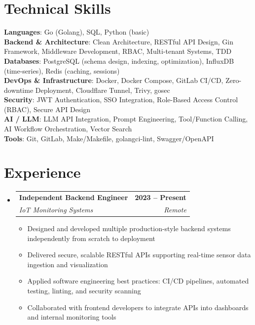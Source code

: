 \documentclass[letterpaper,11pt]{article}
\makeatletter
\newcommand{\resumeItem}[1]{
  \item\small{
    {#1 \vspace{-2pt}}
  }
}
\newcommand{\resumeSubheading}[4]{
  \vspace{-2pt}\item
    \begin{tabular*}{1.0\textwidth}[t]{l@{\extracolsep{\fill}}r}
      \textbf{#1} & \textbf{\small #2} \\
      \textit{\small#3} & \textit{\small #4} \\
    \end{tabular*}\vspace{-7pt}
}
\newcommand{\resumeSubHeadingListStart}{\begin{itemize}[leftmargin=0.0in, label={}]}
\newcommand{\resumeSubHeadingListEnd}{\end{itemize}}
\newcommand{\resumeItemListStart}{\begin{itemize}}
\newcommand{\resumeItemListEnd}{\end{itemize}\vspace{-5pt}}
\makeatother
\begin{document}
\section{Technical Skills}
 \begin{itemize}[leftmargin=0.15in, label={}]
    \small{\item{
     \textbf{Languages}{: Go (Golang), SQL, Python (basic)} \\
     \textbf{Backend \& Architecture}{: Clean Architecture, RESTful API Design, Gin Framework, Middleware Development, RBAC, Multi-tenant Systems, TDD} \\
     \textbf{Databases}{: PostgreSQL (schema design, indexing, optimization), InfluxDB (time-series), Redis (caching, sessions)} \\
     \textbf{DevOps \& Infrastructure}{: Docker, Docker Compose, GitLab CI/CD, Zero-downtime Deployment, Cloudflare Tunnel, Trivy, gosec} \\
     \textbf{Security}{: JWT Authentication, SSO Integration, Role-Based Access Control (RBAC), Secure API Design} \\
     \textbf{AI / LLM}{: LLM API Integration, Prompt Engineering, Tool/Function Calling, AI Workflow Orchestration, Vector Search} \\
     \textbf{Tools}{: Git, GitLab, Make/Makefile, golangci-lint, Swagger/OpenAPI}
    }}
 \end{itemize}
 \vspace{-16pt}


\section{Experience}
  \resumeSubHeadingListStart

    \resumeSubheading
      {Independent Backend Engineer}{2023 -- Present}
      {IoT Monitoring Systems}{Remote}
      \resumeItemListStart
        \resumeItem{Designed and developed multiple production-style backend systems independently from scratch to deployment}
        \resumeItem{Delivered secure, scalable RESTful APIs supporting real-time sensor data ingestion and visualization}
        \resumeItem{Applied software engineering best practices: CI/CD pipelines, automated testing, linting, and security scanning}
        \resumeItem{Collaborated with frontend developers to integrate APIs into dashboards and internal monitoring tools}
      \resumeItemListEnd
    
  \resumeSubHeadingListEnd
\vspace{-12pt}
\end{document}
